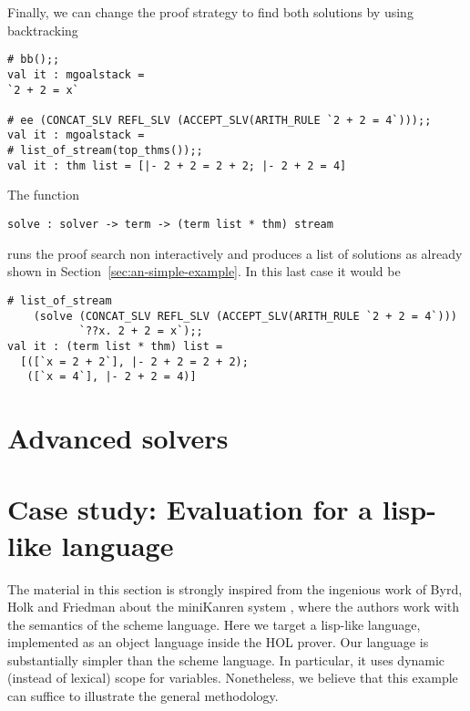 Finally, we can change the proof strategy to find both solutions by
using backtracking
\begin{verbatim}
# bb();;
val it : mgoalstack = 
`2 + 2 = x`

# ee (CONCAT_SLV REFL_SLV (ACCEPT_SLV(ARITH_RULE `2 + 2 = 4`)));;
val it : mgoalstack = 
# list_of_stream(top_thms());;
val it : thm list = [|- 2 + 2 = 2 + 2; |- 2 + 2 = 4]
\end{verbatim}

The function
\begin{verbatim}
solve : solver -> term -> (term list * thm) stream
\end{verbatim}
runs the proof search non interactively and produces a list of
solutions as already shown in Section~\ref{sec:an-simple-example}.  In
this last case it would be
\begin{verbatim}
# list_of_stream
    (solve (CONCAT_SLV REFL_SLV (ACCEPT_SLV(ARITH_RULE `2 + 2 = 4`)))
           `??x. 2 + 2 = x`);;
val it : (term list * thm) list =
  [([`x = 2 + 2`], |- 2 + 2 = 2 + 2);
   ([`x = 4`], |- 2 + 2 = 4)]
\end{verbatim}

\section{Advanced solvers}
\label{sec:advanced-solvers}


\section{Case study: Evaluation for a lisp-like language}
\label{sec:lisp-eval}

The material in this section is strongly inspired from the ingenious
work of Byrd, Holk and Friedman about the miniKanren system
\cite{Byrd:2012:MLU:2661103.2661105}, where the authors work with the
semantics of the scheme language.  Here we target a lisp-like
language, implemented as an object language inside the HOL prover.
Our language is substantially simpler than the scheme language.  In
particular, it uses dynamic (instead of lexical) scope for variables.
Nonetheless, we believe that this example can suffice to illustrate
the general methodology.

